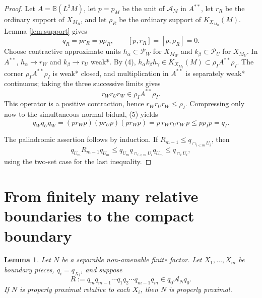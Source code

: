 \documentclass[12pt]{article}
\newtheorem{lemma}{Lemma}
\newcommand{\cA}{\mathcal A}
\begin{document}
\begin{proof}
Let \(A=\mathbb B(L^2M)\), let \(p=p_M\) be the unit of \(\cA_M\) in
\(A^{**}\), let \(r_R\) be the ordinary support of \(X_{M_R}\), and let
\(\rho_R\) be the ordinary support of \(K_{X_{M_R}}(M)\).  Lemma
\ref{lem:support} gives
\[
        q_R=pr_R=p\rho_R,\qquad [p,r_R]=[p,\rho_R]=0 .              \tag{5}
\]
Choose contractive approximate units
\(h_\alpha\subset\mathcal P_W\) for \(X_{M_W}\) and
\(k_\beta\subset\mathcal P_U\) for \(X_{M_U}\).  In \(A^{**}\),
\(h_\alpha\to r_W\) and \(k_\beta\to r_U\) weak*.  By (4),
\(h_\alpha k_\beta h_\gamma\in K_{X_{M_I}}(M)\subset
\rho_IA^{**}\rho_I\).  The corner \(\rho_IA^{**}\rho_I\) is weak* closed, and
multiplication in \(A^{**}\) is separately weak* continuous; taking the three
successive limits gives
\[
        r_W r_U r_W\in \rho_I A^{**}\rho_I .
\]
This operator is a positive contraction, hence \(r_Wr_Ur_W\le \rho_I\).
Compressing only now to the simultaneous normal bidual, (5) yields
\[
 q_Wq_Uq_W
 =(pr_Wp)(pr_Up)(pr_Wp)
 =p\,r_Wr_Ur_W\,p
 \le p\rho_Ip=q_I .
\]

The palindromic assertion follows by induction.  If
\(R_{m-1}\le q_{\cap_{i<m}U_i}\), then
\[
q_{U_m}R_{m-1}q_{U_m}
 \le q_{U_m}q_{\cap_{i<m}U_i}q_{U_m}
 \le q_{\cap_iU_i},
\]
using the two-set case for the last inequality.
\end{proof}

\section*{From finitely many relative boundaries to the compact boundary}

\begin{lemma}\label{lem:finite}
Let \(N\) be a separable non-amenable finite factor.  Let
\(X_1,\ldots,X_m\) be boundary pieces, \(q_i=q_{X_i}\), and suppose
\[
        R:=q_mq_{m-1}\cdots q_1q_2\cdots q_{m-1}q_m\in q_0\cA_Nq_0. \tag{6}
\]
If \(N\) is properly proximal relative to each \(X_i\), then \(N\) is properly
proximal.
\end{lemma}
\end{document}
